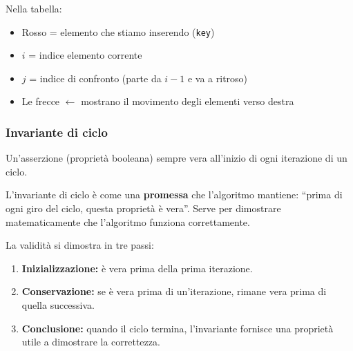 \begin{softnote}
	Nella tabella:
	\begin{itemize}
		\item \textcolor{codered}{Rosso} = elemento che stiamo inserendo (\texttt{key})
		\item $i$ = indice elemento corrente
		\item $j$ = indice di confronto (parte da $i-1$ e va a ritroso)
		\item Le frecce $\leftarrow$ mostrano il movimento degli elementi verso destra
	\end{itemize}
\end{softnote}

\pagebreak
\subsubsection*{Invariante di ciclo}

\begin{definizione}
	Un'asserzione (proprietà booleana) sempre vera all'inizio
	di ogni iterazione di un ciclo.
\end{definizione}

\begin{nota}
	L'invariante di ciclo è come una \textbf{promessa} che l'algoritmo mantiene: ``prima di ogni giro del ciclo, questa proprietà è vera''. Serve per dimostrare matematicamente che l'algoritmo funziona correttamente.
\end{nota}

La validità si dimostra in tre passi:
\begin{enumerate}
	\item \textbf{Inizializzazione:} è vera prima della prima iterazione.
	\item \textbf{Conservazione:} se è vera prima di un'iterazione,
	rimane vera prima di quella successiva.
	\item \textbf{Conclusione:} quando il ciclo termina, l'invariante
	fornisce una proprietà utile a dimostrare la correttezza.
\end{enumerate}

